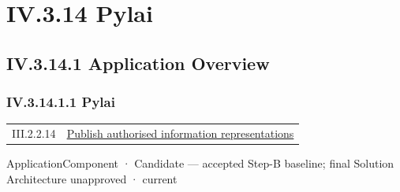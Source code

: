 \section*{IV.3.14 Pylai}
\label{navigation:IV.3.14}

\subsection*{IV.3.14.1 Application Overview}
\label{navigation:IV.3.14.1}

\subsubsection*{IV.3.14.1.1 Pylai}
\label{navigation:IV.3.14.1.1}

\begin{longtable}{p{.22\linewidth}p{.73\linewidth}}
III.2.2.14 & \hyperref[element:91da459e860e4f359e440a65f0c94bcb]{Publish authorised information representations} \\
\end{longtable}
\label{element:e3e4147fea3640198dc251ed41ee854d}
{\small ApplicationComponent · Candidate — accepted Step-B baseline; final Solution Architecture unapproved · current}\par

